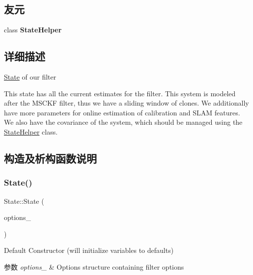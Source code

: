 \subsection*{友元}
\begin{DoxyCompactItemize}
\item 
\mbox{\label{classov__msckf_1_1State_abaf77b0c719a76ee0fd7282a087577da}} 
class {\bfseries State\+Helper}
\end{DoxyCompactItemize}


\subsection{详细描述}
\hyperlink{classov__msckf_1_1State}{State} of our filter 

This state has all the current estimates for the filter. This system is modeled after the M\+S\+C\+KF filter, thus we have a sliding window of clones. We additionally have more parameters for online estimation of calibration and S\+L\+AM features. We also have the covariance of the system, which should be managed using the \hyperlink{classov__msckf_1_1StateHelper}{State\+Helper} class. 

\subsection{构造及析构函数说明}
\mbox{\label{classov__msckf_1_1State_ad6098accfeb57e7eb8c8a22bfd45ec0b}} 
\subsubsection{\texorpdfstring{State()}{State()}}
{\footnotesize\ttfamily State\+::\+State (\begin{DoxyParamCaption}\item[{\hyperlink{structov__msckf_1_1StateOptions}{State\+Options} \&}]{options\+\_\+ }\end{DoxyParamCaption})}



Default Constructor (will initialize variables to defaults) 


\begin{DoxyParams}{参数}
{\em options\+\_\+} & Options structure containing filter options \\
\hline
\end{DoxyParams}


